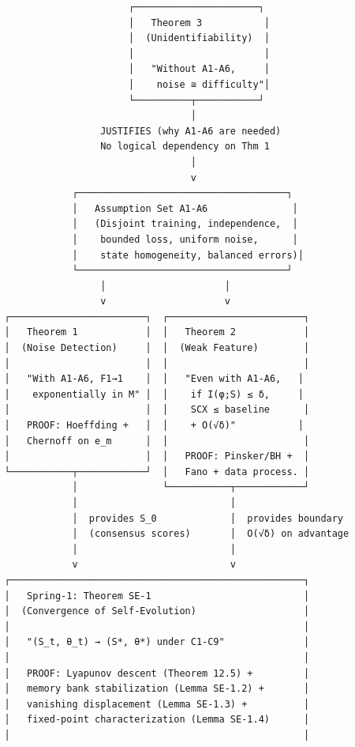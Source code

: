 \documentclass[
  12pt,
]{ctexart}
\begin{document}
\begin{verbatim}
                         ┌──────────────────────┐
                         │   Theorem 3           │
                         │  (Unidentifiability)  │
                         │                       │
                         │   "Without A1-A6,     │
                         │    noise ≅ difficulty"│
                         └──────────┬───────────┘
                                    │
                    JUSTIFIES (why A1-A6 are needed)
                    No logical dependency on Thm 1
                                    │
                                    v
               ┌─────────────────────────────────────┐
               │   Assumption Set A1-A6               │
               │   (Disjoint training, independence,  │
               │    bounded loss, uniform noise,      │
               │    state homogeneity, balanced errors)│
               └─────────────────────────────────────┘
                    │                     │
                    v                     v
   ┌────────────────────────┐  ┌────────────────────────┐
   │   Theorem 1            │  │   Theorem 2            │
   │  (Noise Detection)     │  │  (Weak Feature)        │
   │                        │  │                        │
   │   "With A1-A6, F1→1    │  │   "Even with A1-A6,   │
   │    exponentially in M" │  │    if I(φ;S) ≤ δ,     │
   │                        │  │    SCX ≤ baseline      │
   │   PROOF: Hoeffding +   │  │    + O(√δ)"           │
   │   Chernoff on e_m      │  │                        │
   │                        │  │   PROOF: Pinsker/BH +  │
   └───────────┬────────────┘  │   Fano + data process. │
               │               └───────────┬────────────┘
               │                           │
               │  provides S_0             │  provides boundary
               │  (consensus scores)       │  O(√δ) on advantage
               │                           │
               v                           v
   ┌────────────────────────────────────────────────────┐
   │   Spring-1: Theorem SE-1                           │
   │  (Convergence of Self-Evolution)                   │
   │                                                    │
   │   "(S_t, θ_t) → (S*, θ*) under C1-C9"              │
   │                                                    │
   │   PROOF: Lyapunov descent (Theorem 12.5) +         │
   │   memory bank stabilization (Lemma SE-1.2) +       │
   │   vanishing displacement (Lemma SE-1.3) +          │
   │   fixed-point characterization (Lemma SE-1.4)      │
   │                                                    │

\end{verbatim}
\end{document}
